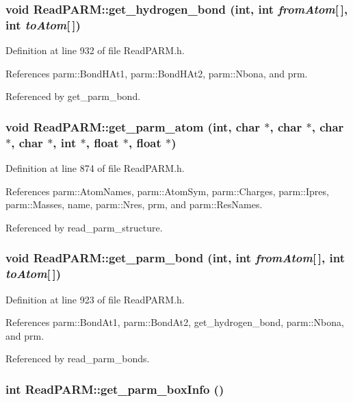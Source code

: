 \subsubsection{\setlength{\rightskip}{0pt plus 5cm}void Read\-PARM::get\_\-hydrogen\_\-bond (int, int {\em from\-Atom}[$\,$], int {\em to\-Atom}[$\,$])}\label{classReadPARM_a9}




Definition at line 932 of file Read\-PARM.h.

References parm::Bond\-HAt1, parm::Bond\-HAt2, parm::Nbona, and prm.

Referenced by get\_\-parm\_\-bond.
\subsubsection{\setlength{\rightskip}{0pt plus 5cm}void Read\-PARM::get\_\-parm\_\-atom (int, char $\ast$, char $\ast$, char $\ast$, char $\ast$, int $\ast$, float $\ast$, float $\ast$)}\label{classReadPARM_a7}




Definition at line 874 of file Read\-PARM.h.

References parm::Atom\-Names, parm::Atom\-Sym, parm::Charges, parm::Ipres, parm::Masses, name, parm::Nres, prm, and parm::Res\-Names.

Referenced by read\_\-parm\_\-structure.
\subsubsection{\setlength{\rightskip}{0pt plus 5cm}void Read\-PARM::get\_\-parm\_\-bond (int, int {\em from\-Atom}[$\,$], int {\em to\-Atom}[$\,$])}\label{classReadPARM_a8}




Definition at line 923 of file Read\-PARM.h.

References parm::Bond\-At1, parm::Bond\-At2, get\_\-hydrogen\_\-bond, parm::Nbona, and prm.

Referenced by read\_\-parm\_\-bonds.
\subsubsection{\setlength{\rightskip}{0pt plus 5cm}int Read\-PARM::get\_\-parm\_\-box\-Info ()}\label{classReadPARM_a12}




